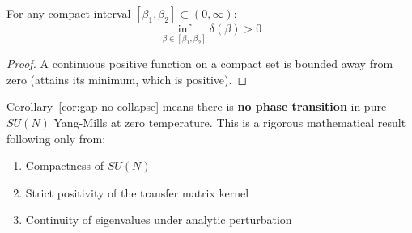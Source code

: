 \begin{corollary}
\label{cor:gap-no-collapse}
For any compact interval $[\beta_1, \beta_2] \subset (0, \infty)$:
\[
\inf_{\beta \in [\beta_1, \beta_2]} \delta(\beta) > 0
\]
\end{corollary}

\begin{proof}
A continuous positive function on a compact set is bounded away from zero 
(attains its minimum, which is positive).
\end{proof}

\begin{remark}
Corollary~\ref{cor:gap-no-collapse} means there is \textbf{no phase transition} 
in pure $SU(N)$ Yang-Mills at zero temperature. This is a rigorous mathematical 
result following only from:
\begin{enumerate}[label=(\alph*)]
\item Compactness of $SU(N)$
\item Strict positivity of the transfer matrix kernel
\item Continuity of eigenvalues under analytic perturbation
\end{enumerate}
\end{remark}






